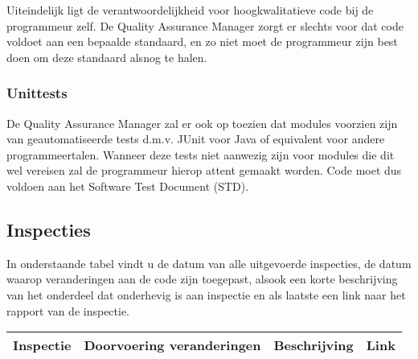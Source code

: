 Uiteindelijk ligt de verantwoordelijkheid voor hoogkwalitatieve code bij de programmeur zelf. De Quality Assurance Manager zorgt er slechts voor dat code voldoet aan een bepaalde standaard, en zo niet moet de programmeur zijn best doen om deze standaard alsnog te halen. 

\subsubsection{Unittests}
De Quality Assurance Manager zal er ook op toezien dat modules voorzien zijn van geautomatiseerde tests d.m.v. JUnit voor Java of equivalent voor andere programmeertalen. Wanneer deze tests niet aanwezig zijn voor modules die dit wel vereisen zal de programmeur hierop attent gemaakt worden. Code moet dus voldoen aan het Software Test Document (STD).

\subsection{Inspecties}
In onderstaande tabel vindt u de datum van alle uitgevoerde inspecties, de datum waarop veranderingen aan de code zijn toegepast, alsook een korte beschrijving van het onderdeel dat onderhevig is aan inspectie en als laatste een link naar het rapport van de inspectie.

\begin{center}
    \begin{tabular}{| l | l | l | l |}
    \hline
    Inspectie & Doorvoering veranderingen & Beschrijving & Link \\ \hline
    
    \end{tabular}
\end{center}


